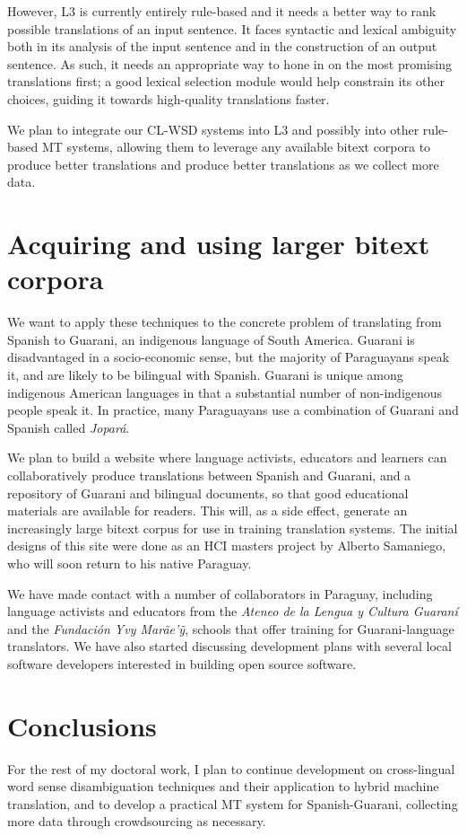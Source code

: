 \documentclass{article}
\begin{document}
However, L3 is currently entirely rule-based and it needs a better way to rank
possible translations of an input sentence. It faces syntactic and lexical
ambiguity both in its analysis of the input sentence and in the construction of
an output sentence. As such, it needs an appropriate way to hone in on the most
promising translations first; a good lexical selection module would help
constrain its other choices, guiding it towards high-quality translations
faster.

We plan to integrate our CL-WSD systems into L3 and possibly into other
rule-based MT systems, allowing them to leverage any available bitext corpora
to produce better translations and produce better translations as we collect
more data.

\section{Acquiring and using larger bitext corpora}
We want to apply these techniques to the concrete problem of translating from
Spanish to Guarani, an indigenous language of South America. Guarani is
disadvantaged in a socio-economic sense, but the majority of Paraguayans speak
it, and are likely to be bilingual with Spanish. Guarani is unique among
indigenous American languages in that a substantial number of non-indigenous
people speak it. In practice, many Paraguayans use a combination of Guarani and
Spanish called \emph{Jopar{\'a}}.

We plan to build a website where language activists, educators and learners can
collaboratively produce translations between Spanish and Guarani, and a
repository of Guarani and bilingual documents, so that good educational
materials are available for readers. This will, as a side effect, generate an
increasingly large bitext corpus for use in training translation systems.  The
initial designs of this site were done as an HCI masters project by Alberto
Samaniego, who will soon return to his native Paraguay.

We have made contact with a number of collaborators in Paraguay, including
language activists and educators from the \emph{Ateneo de la Lengua y Cultura
Guaraní} and the \emph{Fundación Yvy Marãe'{\~y}}, schools that offer training
for Guarani-language translators. We have also started discussing development
plans with several local software developers interested in building open source
software.

\section{Conclusions}
For the rest of my doctoral work, I plan to continue development on
cross-lingual word sense disambiguation techniques and their application to
hybrid machine translation, and to develop a practical MT system for
Spanish-Guarani, collecting more data through crowdsourcing as necessary.
\end{document}
